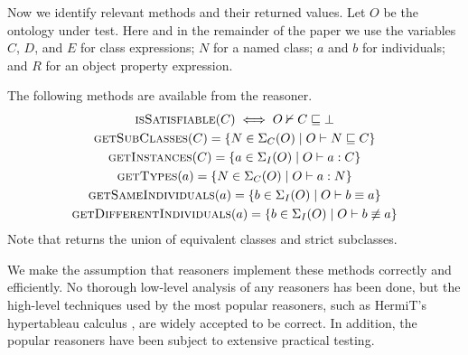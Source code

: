 \documentclass[paper.tex]{subfiles}
\begin{document}
Now we identify relevant methods and their returned values.
Let $O$ be the ontology under test.
Here and in the remainder of the paper we use the variables $C$, $D$, and $E$ for class expressions; $N$ for a named class; $a$ and $b$ for individuals; and $R$ for an object property expression.

\begin{definition}
  The following methods are available from the reasoner.
  \begin{gather*}
    \Call{isSatisfiable}{C} \iff O \nsementails C \sqsubseteq \bot \\
    \Call{getSubClasses}{C} = \{ N \in \signatureC(O) \mid O \sementails N \sqsubseteq C \} \\
    \Call{getInstances}{C} = \{ a \in \signatureI(O) \mid O \sementails a : C \} \\
    \Call{getTypes}{a} = \{ N \in \signatureC(O) \mid O \sementails a : N \} \\
    \Call{getSameIndividuals}{a} = \{ b \in \signatureI(O) \mid O \sementails b \equiv a \} \\
    \Call{getDifferentIndividuals}{a} = \{ b \in \signatureI(O) \mid O \sementails b \not\equiv a \}
  \end{gather*}
  Note that  returns the union of equivalent classes and strict subclasses.
\end{definition}

We make the assumption that reasoners implement these methods correctly and efficiently.  No thorough low-level analysis of any reasoners has been done, but the high-level techniques used by the most popular reasoners, such as HermiT's hypertableau calculus \cite{Glimm:HermiT}, are widely accepted to be correct.  In addition, the popular reasoners have been subject to extensive practical testing.
\end{document}
